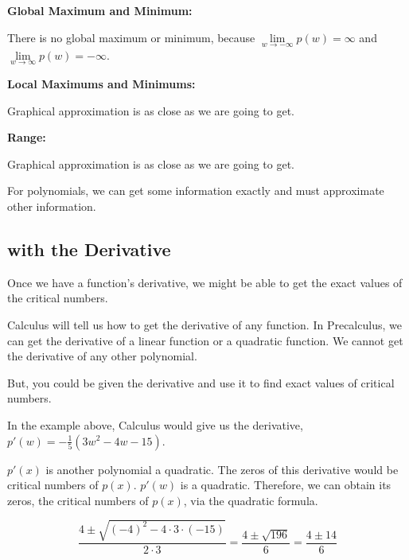 \documentclass{ximera}
\begin{document}
\begin{example}
\textbf{Global Maximum and Minimum:}

There is no global maximum or minimum, because  $\lim\limits_{w \to -\infty}p(w) = \infty$ and $\lim\limits_{w \to \infty}p(w) = -\infty$. 







\textbf{Local Maximums and Minimums:}

Graphical approximation is as close as we are going to get. 






\textbf{Range:}

Graphical approximation is as close as we are going to get. 

\end{example}

For polynomials, we can get some information exactly and must approximate other information.















\subsection*{with the Derivative}


Once we have a function's derivative, we might be able to get the exact values of the critical numbers. 


Calculus will tell us how to get the derivative of any function.  In Precalculus, we can get the derivative of a linear function or a quadratic function.  We cannot get the derivative of any other polynomial.

But, you could be given the derivative and use it to find exact values of critical numbers. 




In the example above, Calculus would give us the derivative, $p'(w) = -\frac{1}{5}(3w^2 - 4w - 15)$. 

$p'(x)$ is another polynomial a quadratic. The zeros of this derivative would be critical numbers of $p(x)$.  $p'(w)$ is a quadratic.  Therefore, we can obtain its zeros, the critical numbers of $p(x)$, via the quadratic formula.


\[  \frac{4 \pm \sqrt{(-4)^2 - 4 \cdot 3 \cdot (-15)}}{2 \cdot 3} =    \frac{4 \pm \sqrt{196}}{6}  = \frac{4 \pm 14}{6}       \]
\end{document}
